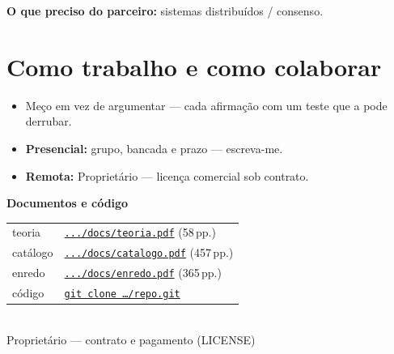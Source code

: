 \documentclass[11pt,a4paper]{article}
\begin{document}
\smallskip
\textbf{O que preciso do parceiro:} sistemas distribuídos / consenso.

\section*{Como trabalho e como colaborar}

\begin{itemize}
\item Meço em vez de argumentar --- cada afirmação com um teste que a pode derrubar.
\item \textbf{Presencial:} grupo, bancada e prazo --- escreva-me.
\item \textbf{Remota:} Proprietário — licença comercial sob contrato.
\end{itemize}

\medskip
\begin{center}\small
\textbf{Documentos e código}\\[4pt]
\begin{tabular}{@{}ll@{}}
teoria &
\href{https://goldenkingdom.patriatechnology.com/docs/teoria.pdf}{\texttt{.../docs/teoria.pdf}}
\quad (58\,pp.) \\
catálogo &
\href{https://goldenkingdom.patriatechnology.com/docs/catalogo.pdf}{\texttt{.../docs/catalogo.pdf}}
\quad (457\,pp.) \\
enredo &
\href{https://goldenkingdom.patriatechnology.com/docs/enredo.pdf}{\texttt{.../docs/enredo.pdf}}
\quad (365\,pp.) \\
código &
\href{https://goldenkingdom.patriatechnology.com/repo.git}{\texttt{git clone \ldots/repo.git}} \\
\end{tabular}
\\[4pt]
{\footnotesize\color{cinza}Proprietário — contrato e pagamento (LICENSE)}
\end{center}
\end{document}
